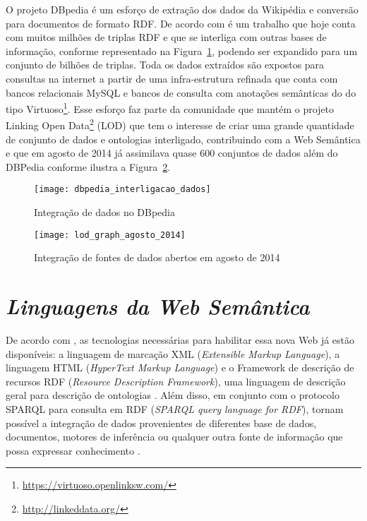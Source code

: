 O projeto DBpedia é um esforço de extração dos dados da Wikipédia e conversão para documentos de formato RDF. De acordo com \citet{Auer2007} é um trabalho que hoje conta com muitos milhões de triplas RDF e que se interliga com outras bases de informação, conforme representado na Figura~\ref{fig:dbpedia_interligacao_dados}, podendo ser expandido para um conjunto de bilhões de triplas. Toda os dados extraídos são expostos para consultas na internet a partir de uma infra-estrutura refinada que conta com bancos relacionais MySQL e bancos de consulta com anotações semânticas do do tipo Virtuoso\footnote{\url{https://virtuoso.openlinksw.com/}}. Esse esforço faz parte da comunidade que mantém o projeto Linking Open Data\footnote{\url{http://linkeddata.org/}} (LOD) que tem o interesse de criar uma grande quantidade de conjunto de dados e ontologias interligado, contribuindo com a Web Semântica e que em agosto de 2014 já assimilava quase 600 conjuntos de dados além do DBPedia conforme ilustra a Figura~\ref{fig:lod_graph_agosto_2014}. 

\begin{figure}[!ht]
  \centering
  \texttt{[image: dbpedia\_interligacao\_dados]} 
  \caption{Integração de dados no DBpedia \citep{Auer2007}}
  \label{fig:dbpedia_interligacao_dados} 
\end{figure}

\begin{figure}[p]
  \centering
  \texttt{[image: lod\_graph\_agosto\_2014]} 
  \caption{Integração de fontes de dados abertos em agosto de 2014 \citep{Cyganiak2014}}
  \label{fig:lod_graph_agosto_2014} 
\end{figure}

\section{\emph{Linguagens da Web Semântica}}
\label{sec:linguagens_web_semantica}

De acordo com \citet{Allemang2011}, as tecnologias necessárias para habilitar essa nova Web já estão disponíveis: a linguagem de marcação XML (\emph{Extensible Markup Language}), a linguagem HTML (\emph{HyperText Markup Language}) e o Framework de descrição de recursos RDF (\emph{Resource Description Framework}), uma linguagem de descrição geral para descrição de ontologias \citep{Wang}. Além disso, em conjunto com o protocolo SPARQL para consulta em RDF (\emph{SPARQL query language for RDF}), tornam possível a integração de dados provenientes de diferentes base de dados, documentos, motores de inferência ou qualquer outra fonte de informação que possa expressar conhecimento \citep{Wang}.

